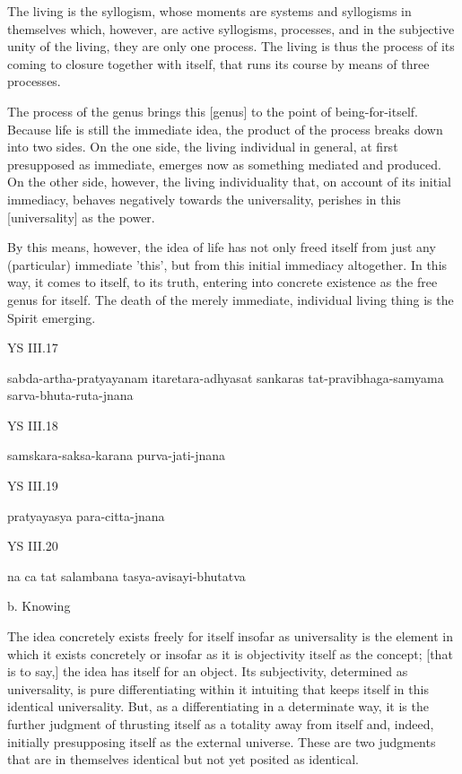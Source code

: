 The living is the syllogism, whose moments are
systems and syllogisms in themselves
which, however, are active syllogisms, processes, and
in the subjective unity of the living,
they are only one process.
The living is thus the process of
its coming to closure together with itself,
that runs its course by means of three processes.

The process of the genus brings this [genus] to
the point of being-for-itself.
Because life is still the immediate idea,
the product of the process breaks down into two sides.
On the one side, the living individual in general,
at first presupposed as immediate,
emerges now as something mediated and produced.
On the other side, however, the living individuality that,
on account of its initial immediacy,
behaves negatively towards the universality,
perishes in this [universality] as the power.

By this means, however, the idea of life
has not only freed itself from just
any (particular) immediate 'this',
but from this initial immediacy altogether.
In this way, it comes to itself, to its truth,
entering into concrete existence
as the free genus for itself.
The death of the merely immediate,
individual living thing is the Spirit emerging.

YS III.17

sabda-artha-pratyayanam itaretara-adhyasat sankaras
tat-pravibhaga-samyama sarva-bhuta-ruta-jnana

YS III.18

samskara-saksa-karana purva-jati-jnana

YS III.19

pratyayasya para-citta-jnana

YS III.20

na ca tat salambana tasya-avisayi-bhutatva

b. Knowing

The idea concretely exists freely for itself
insofar as universality is the element
in which it exists concretely
or insofar as it is objectivity itself as the concept;
[that is to say,] the idea has itself for an object.
Its subjectivity, determined as universality,
is pure differentiating within it
intuiting that keeps itself in this identical universality.
But, as a differentiating in a determinate way,
it is the further judgment of thrusting itself as
a totality away from itself
and, indeed, initially
presupposing itself as the external universe.
These are two judgments that are in themselves identical
but not yet posited as identical.

